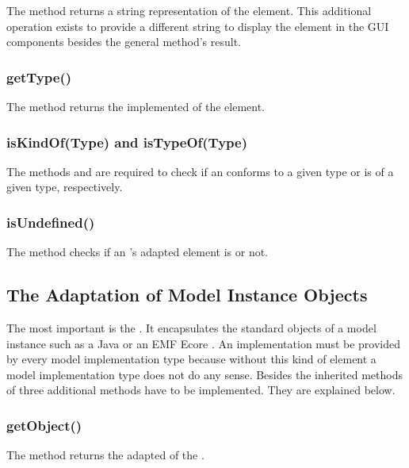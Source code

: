 The method  returns a string representation of the element. This additional operation exists to provide a different string to display the element in the \acs{GUI} components besides the general  method's result.

\subsubsection{getType()}

The method  returns the implemented  of the element.

\subsubsection{isKindOf(Type) and isTypeOf(Type)}

The methods  and  are required to check if an  conforms to a given type or is of a given type, respectively.

\subsubsection{isUndefined()}

The method  checks if an 's adapted element is  or not.


\subsection{The Adaptation of Model Instance Objects}

The most important  is the . It encapsulates the standard objects of a model instance such as a Java  or an \acs{EMF} Ecore . An  implementation must be provided by every model implementation type because without this kind of element a model implementation type does not do any sense. Besides the inherited methods of  three additional methods have to be implemented. They are explained below.

\subsubsection{getObject()}

The method  returns the adapted  of the .

